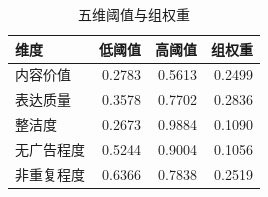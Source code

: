 \begin{table}[htbp]\centering
\caption{五维阈值与组权重}\label{tab:q1_conflict_thresholds}
\begin{tabular}{lrrr}
\toprule
维度 & 低阈值 & 高阈值 & 组权重 \\
\midrule
内容价值 & 0.2783 & 0.5613 & 0.2499 \\
表达质量 & 0.3578 & 0.7702 & 0.2836 \\
整洁度 & 0.2673 & 0.9884 & 0.1090 \\
无广告程度 & 0.5244 & 0.9004 & 0.1056 \\
非重复程度 & 0.6366 & 0.7838 & 0.2519 \\
\bottomrule\end{tabular}\end{table}
